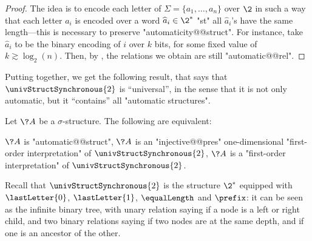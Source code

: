 \begin{proof}
	The idea is to encode each letter of $\Sigma = \{a_1,\dotsc,a_n\}$
	over $\2$ in such a way that each letter $a_i$
	is encoded over a word $\widehat a_i \in \2^*$ "st"
	all $\widehat a_i$'s have the same length---this is necessary to preserve "automaticity@@struct".
	For instance, take $\widehat a_i$ to be the binary encoding of $i$
	over $k$ bits, for some fixed value of $k \gtrsim \log_2(n)$.
	Then, by ,
	the relations we obtain are still "automatic@@rel".
\end{proof}

Putting 
together, we get the following result, that says that $\univStructSynchronous{2}$ is ``universal'',
in the sense that it is not only automatic, but it ``contains'' all "automatic structures".
\begin{proposition}
	\AP\label{prop:universal-automatic-structure}
	Let $\?A$ be a $\sigma$-structure. The following are equivalent:
	\begin{enumerate}
		\itemAP\label{item:universal-automatic-structure-auto}
			$\?A$ is "automatic@@struct",
		\itemAP\label{item:universal-automatic-structure-injective-FO}
			$\?A$ is an "injective@@pres" one-dimensional "first-order interpretation" of
			$\univStructSynchronous{2}$,
		\itemAP\label{item:universal-automatic-structure-FO}
			$\?A$ is a "first-order interpretation" of $\univStructSynchronous{2}$.
	\end{enumerate}
\end{proposition}

Recall that $\univStructSynchronous{2}$ is the structure $\2^*$ equipped
with $\lastLetter{0}$, $\lastLetter{1}$, $\equalLength$ and $\prefix$: it can be
seen as the infinite binary tree, with unary relation saying if a node is a
left or right child, and two binary relations saying if two nodes are
at the same depth, and if one is an ancestor of the other.

